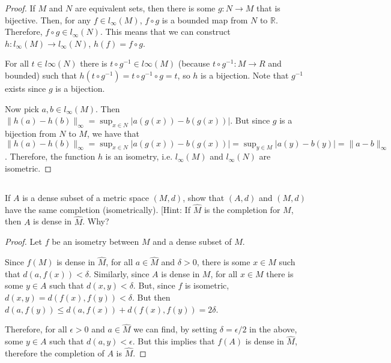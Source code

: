 \begin{proof}
If $M$ and $N$ are equivalent sets, then there is some $g:N \rightarrow M$ that is bijective. Then, for any $f\in l_\infty(M)$, $f \circ g$ is a bounded map from $N$ to $\mathbb{R}$. Therefore,  $f \circ g \in l_\infty(N)$. This means that we can construct $h:l_\infty(M) \rightarrow l_\infty(N)$, $h(f) = f \circ g$.

For all $t \in l\infty(N)$ there is $t \circ g^{-1} \in l\infty(M)$ (because $t \circ g^{-1}: M \rightarrow R$ and bounded) such that $h(t \circ g^{-1}) = t \circ g^{-1} \circ g = t$, so $h$ is a bijection. Note that $g^{-1}$ exists since $g$ is a bijection.

Now pick $a,b \in l_\infty(M)$. Then $\|h(a) - h(b)\|_\infty = \sup_{x\in N}{|a(g(x)) - b(g(x))|}$. But since $g$ is a bijection from $N$ to $M$, we have that $\|h(a) - h(b)\|_\infty = \sup_{x\in N}{|a(g(x)) - b(g(x))|} = \sup_{y\in M}{|a(y) - b(y)|} = \|a - b\|_\infty$. Therefore, the function $h$ is an isometry, i.e. $l_\infty(M)$ and $l_\infty(N)$ are isometric.


\end{proof}


\subsection{} If $A$ is a dense subset of a metric space $(M, d)$, show that $(A, d)$ and $(M, d)$ have the same completion (isometrically). [Hint: If $\hat{M}$ is the completion for $M$, then $A$ is dense in $\hat{M}$. Why?

\begin{proof}
Let $f$ be an isometry between $M$ and a dense subset of $\hat{M}$.

Since $f(M)$ is dense in $\hat{M}$, for all $a \in \hat{M}$ and $\delta > 0$, there is some $x \in M$ such that $d(a, f(x)) < \delta$. Similarly, since $A$ is dense in $M$, for all $x \in M$ there is some $y \in A$ such that $d(x, y) < \delta$. But, since $f$ is isometric, $d(x,y) = d(f(x), f(y)) < \delta$. But then $d(a, f(y)) \leq d(a,f(x)) + d(f(x), f(y)) = 2\delta$.

Therefore, for all $\epsilon > 0$ and $a \in \hat{M}$ we can find, by setting $\delta = \epsilon/2$ in the above, some $y \in A$ such that $d(a, y) < \epsilon$. But this implies that $f(A)$ is dense in $\hat{M}$, therefore the completion of $A$ is $\hat{M}$.


\end{proof}

